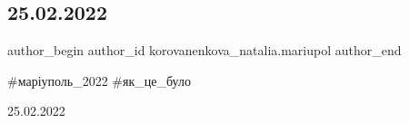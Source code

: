  
 
 
 
 

\subsection{25.02.2022}
\label{sec:25_02_2023.fb.korovanenkova_natalia.mariupol.1.25_02_pic}

\ifcmt
 author_begin
   author_id korovanenkova_natalia.mariupol
 author_end
\fi

\#маріуполь\_2022 \#як\_це\_було

25.02.2022
